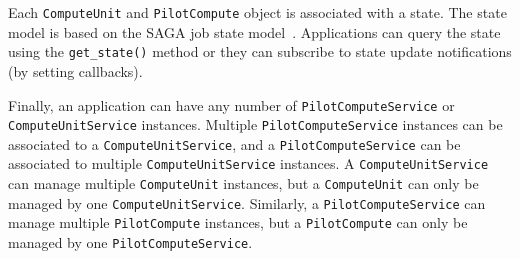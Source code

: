 \documentclass[conference]{IEEEtran}
\begin{document}


Each \texttt{Compute\-Unit} and \texttt{Pilot\-Compute} object is associated
with a state.
The state model is based on the SAGA job state model~\cite{ogf-gfd-90}.
Applications can query the state using the \texttt{get\_state()} method or they
can subscribe to state update notifications (by setting callbacks).

Finally, an application can have any number of \texttt{Pilot\-Compute\-Service} or
\texttt{Compute\-Unit\-Service} instances.
Multiple \texttt{Pilot\-Compute\-Service} instances can be associated to a
\texttt{Compute\-Unit\-Service}, and a \texttt{Pilot\-Compute\-Service} can be associated to
multiple \texttt{Compute\-Unit\-Service} instances.
A \texttt{Compute\-Unit\-Service} can manage multiple \texttt{Compute\-Unit}
instances, but a \texttt{Compute\-Unit} can only be managed by one
\texttt{Compute\-Unit\-Service}.
Similarly, a \texttt{Pilot\-Compute\-Service} can manage multiple
\texttt{Pilot\-Compute} instances, but a \texttt{Pilot\-Compute} can only be
managed by one \texttt{Pilot\-Compute\-Service}.
\end{document}
